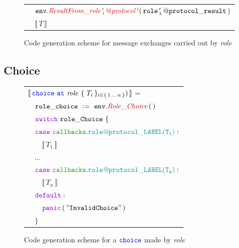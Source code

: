 \documentclass[12pt,twoside]{report}
\begin{document}
\begin{figure}[!h]
\begin{center}
\begin{tabular}{l}
            {\footnotesize
            $\quad \methodcall{\envparam}{ResultFrom\_\localprotocol{role\,'_i\,}{protocol\,'}}\params{\varname{role\,'_i\,@protocol\_result}}$}\\[3pt]
            
            {\footnotesize
            $\quad \llbracket\,T\,\rrbracket$}
            
            

        \end{tabular}
    \end{center}
    \caption{Code generation scheme for message exchanges carried out by \textit{role}}
    \label{message-exchange-codegen}
\end{figure}

\subsection{Choice}\label{choice-impl}
\begin{figure}[!h]
    \begin{center}
        \begin{tabular}{l}
            $\llbracket\,{\color{blue}\mathtt{choice}}\ {\color{blue}\mathtt{at}}\ \mathit{role}\ \{\,\mathit{T}_{i}\,\}_{{i \in \{\,1\,\dots\,n\,\}}})\,\rrbracket$ =\\[10pt]
            
            $\quad \assignment{role\_choice}{\methodcall{\envparam}{Role\_Choice}\,\emptyparams}$\\[3pt]
            
            $\quad \goswitch\ \varname{role\_Choice}\ \{$\\[3pt]

            $\quad \gocase\ \pkgenumaccess{callbacks}{\localprotocol{role}{protocol}\_LABEL(T_1)}:$\\[3pt]

            $\qquad \llbracket\,T_1\,\rrbracket$\\[6pt]

            $\quad \dots$\\[9pt]
            
            $\quad \gocase\ \pkgenumaccess{callbacks}{\localprotocol{role}{protocol}\_LABEL(T_n)}:$\\[3pt]

            $\qquad \llbracket\,T_n\,\rrbracket$\\[6pt]

            $\quad \godefault:$\\[3pt]

            $\qquad \gopanic\,(\,\mathtt{"Invalid Choice"}\,)$\\[3pt]

            $\quad \}$\\
        \end{tabular}
    \end{center}
    \caption{Code generation scheme for a ${\color{blue}\mathtt{choice}}$ made by \textit{role}}
    \label{role-makes-choice-codegen}
\end{figure}
\end{document}
